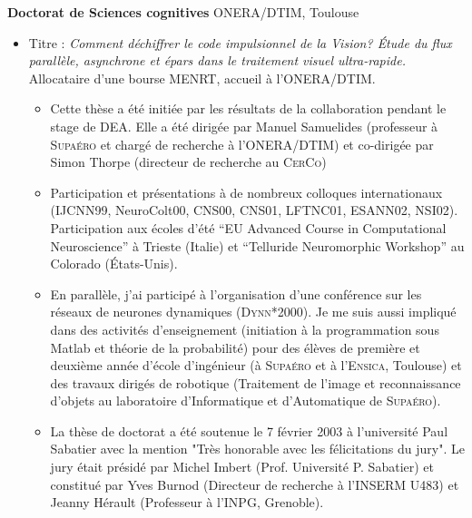 \documentclass[10pt,french,a4paper,oneside]{article}%
\newcommand{\years}[1]{\marginpar{\textit{\scriptsize #1}}}
\begin{document}
\vspace*{.3cm}
	\textbf{Doctorat de Sciences cognitives} ONERA/DTIM, Toulouse \hfill \years{\textbf{1999-2003}} \\
\vspace*{-.15in}
\begin{itemize}
\item[] Titre : \emph{Comment déchiffrer le code impulsionnel de la Vision? \'Etude du flux parallèle, asynchrone et épars  dans le traitement visuel ultra-rapide.}  Allocataire d'une bourse MENRT, accueil à  l'ONERA/DTIM.
\begin{itemize}
		\item %
		Cette thèse a été initiée par les résultats de la collaboration pendant le stage de DEA. Elle a été dirigée par Manuel Samuelides (professeur à  \textsc{Supaéro} et chargé de recherche à  l'ONERA/DTIM) et co-dirigée par Simon Thorpe (directeur de recherche au \textsc{CerCo})
		\item Participation et présentations à  de nombreux colloques internationaux (IJCNN99, NeuroColt00, CNS00, CNS01, LFTNC01, ESANN02, NSI02). Participation aux écoles d'été ``EU Advanced Course in Computational Neuroscience'' à  Trieste (Italie) et ``Telluride Neuromorphic Workshop'' au Colorado (\'Etats-Unis).
		\item %
		En parallèle, j'ai participé à  l'organisation d'une conférence sur les réseaux de neurones dynamiques (\textsc{Dynn}*2000). Je me suis aussi impliqué dans des activités d'enseignement (initiation à  la programmation sous Matlab et théorie de la probabilité) pour des élèves de première et deuxième année d'école d'ingénieur (à  \textsc{Supaéro} et à  l'\textsc{Ensica}, Toulouse) et des travaux dirigés de robotique (Traitement de l'image et reconnaissance d'objets au laboratoire d'Informatique et d'Automatique de \textsc{Supaéro}). %
		\item %
		La thèse de doctorat a été soutenue le 7 février 2003 à  l'université Paul Sabatier avec la mention "Très honorable avec les félicitations du jury". Le jury était présidé par Michel Imbert (Prof. Université P. Sabatier) et constitué par Yves Burnod (Directeur de recherche à  l'\textsc{INSERM} U483) et Jeanny Hérault (Professeur à  l'INPG, Grenoble).
	\end{itemize} %
\end{itemize} %
\end{document}

